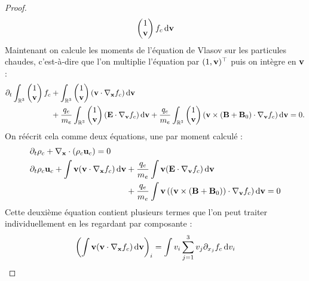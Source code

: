 \begin{proof}
$$\begin{pmatrix}
      1 \\
      \vb{v}
    \end{pmatrix} f_c\dd{\vb{v}}
  $$
  Maintenant on calcule les moments de l'équation de Vlasov sur les particules chaudes, c'est-à-dire que l'on multiplie l'équation par $(1,\vb{v})^\top$ puis on intègre en $\vb{v}$ :
  $$
    \begin{aligned}
    \partial_t\int_{\mathbb{R}^3} \begin{pmatrix}
      1 \\
      \vb{v}
    \end{pmatrix}f_c
    &+
    \int_{\mathbb{R}^3}\begin{pmatrix}
      1 \\
      \vb{v}
    \end{pmatrix}(\vb{v}\cdot\nabla_{\vb{x}}f_c)\dd{\vb{v}} \\
    &+
    \frac{q_e}{m_e}\int_{\mathbb{R}^3}\begin{pmatrix}
      1 \\
      \vb{v}
    \end{pmatrix} (\vb{E}\cdot\nabla_{\vb{v}}f_c)\dd{\vb{v}}
    +
    \frac{q_e}{m_e}\int_{\mathbb{R}^3}\begin{pmatrix}
      1 \\
      \vb{v}
    \end{pmatrix}(\vb{v}\times(\vb{B}+\vb{B}_0) \cdot\nabla_{\vb{v}}f_c)\dd{\vb{v}}
    = 0.
    \end{aligned}
  $$
  On réécrit cela comme deux équations, une par moment calculé :
  $$
    \begin{aligned}
      &\partial_t\rho_c + \nabla_{\vb{x}}\cdot(\rho_c\vb{u}_c) = 0 \\
      &\partial_t\rho_c\vb{u}_c + \int\vb{v}(\vb{v}\cdot\nabla_{\vb{x}}f_c)\dd{\vb{v}} + \frac{q_e}{m_e}\int\vb{v}(\vb{E}\cdot\nabla_{\vb{v}}f_c)\dd{\vb{v}} \\
      &\phantom{\partial_t\rho_c\vb{u}_c + \int\vb{v}(\vb{v}\cdot\nabla_{\vb{x}}f_c)\dd{\vb{v}}}
        + \frac{q_e}{m_e}\int\vb{v}\left((\vb{v}\times(\vb{B}+\vb{B}_0))\cdot\nabla_{\vb{v}}f_c\right)\dd{\vb{v}} = 0
    \end{aligned}
  $$
  Cette deuxième équation contient plusieurs termes que l'on peut traiter individuellement en les regardant par composante :
  $$
    \begin{aligned}
      \left( \int\vb{v}(\vb{v}\cdot\nabla_{\vb{x}}f_c)\dd{\vb{v}} \right)_i
          &= \int v_i \sum_{j=1}^3v_j\partial_{x_j}f_c\dd{v_i} \\

\end{aligned}$$
\end{proof}
